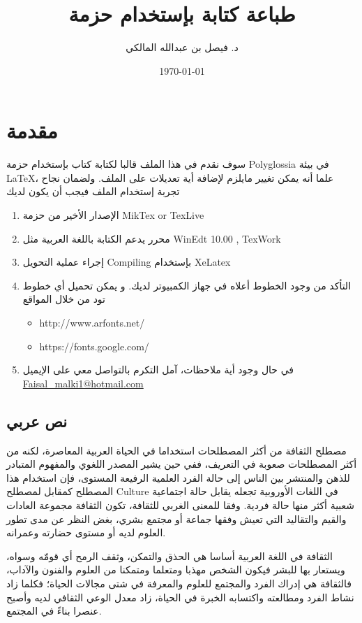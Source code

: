 \documentclass[a4 paper]{report}
\title{طباعة كتابة بإستخدام حزمة \\
\eng{Polyglossia}}
\author{د. فيصل بن عبدالله المالكي}
\date{\today}
\theoremstyle{mystyle}
\theoremstyle{Excercises}
\newcommand{\eng}{\textenglish}  %
\begin{document}
\maketitle
\tableofcontents
\doublespacing
\chapter{ مقدمة}

سوف نقدم في هذا الملف قالبا لكتابة كتاب بإستخدام حزمة 
\eng{Polyglossia}
في بيئة \eng{\LaTeX}، علما أنه يمكن تغيير مايلزم لإضافة أية تعديلات على الملف. ولضمان نجاح تجربة إستخدام الملف فيجب أن يكون لديك
\begin{enumerate}
  \item الإصدار الأخير من حزمة \eng{MikTex or TexLive}
  \item محرر يدعم الكتابة باللغة العربية مثل \eng{WinEdt 10.00 , TexWork}
  \item إجراء عملية التحويل \eng{Compiling} بإستخدام \eng{XeLatex}
  \item التأكد من وجود الخطوط أعلاه في جهاز الكمبيوتر لديك. و يمكن تحميل أي خطوط تود من خلال المواقع
  \setLR
  \begin{itemize}
    \item http://www.arfonts.net/
    \item https://fonts.google.com/
  \end{itemize}
  \setRL
  \item  في حال وجود أية ملاحظات، آمل التكرم بالتواصل معي على الإيميل
  \href{mailto:Faisal_malki1@hotmail.com}{Faisal\_malki1@hotmail.com}
\end{enumerate}

\section{نص عربي}

مصطلح الثقافة من أكثر المصطلحات استخداما في الحياة العربية المعاصرة، لكنه من أكثر المصطلحات صعوبة في التعريف، ففي حين يشير المصدر اللغوي والمفهوم المتبادر للذهن والمنتشر بين الناس إلى حالة الفرد العلمية الرفيعة المستوى، فإن استخدام هذا المصطلح كمقابل لمصطلح \eng{Culture} في اللغات الأوروبية تجعله يقابل حالة اجتماعية شعبية أكثر منها حالة فردية. وفقا للمعنى الغربي للثقافة، تكون الثقافة مجموعة العادات والقيم والتقاليد التي تعيش وفقها جماعة أو مجتمع بشري، بغض النظر عن مدى تطور العلوم لديه أو مستوى حضارته وعمرانه.

الثقافة في اللغة العربية أساسا هي الحذق والتمكن، وثقف الرمح أي قومّه وسواه، ويستعار بها للبشر فيكون الشخص مهذبا ومتعلما ومتمكنا من العلوم والفنون والآداب، فالثقافة هي إدراك الفرد والمجتمع للعلوم والمعرفة في شتى مجالات الحياة؛ فكلما زاد نشاط الفرد ومطالعته واكتسابه الخبرة في الحياة، زاد معدل الوعي الثقافي لديه وأصبح عنصرا بناءً في المجتمع.
\end{document}
